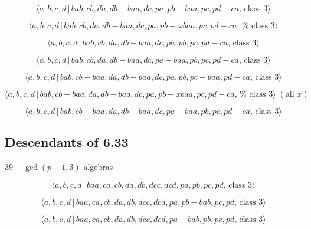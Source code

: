 \documentclass[10pt]{article}
\begin{document}
\begin{equation}
\langle a,b,c,d\,|\,bab,cb,da,db-baa,dc,pa,pb-baa,pc,pd-ca,\,\text{class }%
3\rangle  \tag{7.4075}
\end{equation}

\begin{equation}
\langle a,b,c,d\,|\,bab,cb,da,db-baa,dc,pa,pb-\omega baa,pc,pd-ca,\,\text{%
class }3\rangle  \tag{7.4076}
\end{equation}

\begin{equation}
\langle a,b,c,d\,|\,bab,cb,da,db-baa,dc,pa,pb,pc,pd-ca,\,\text{class }%
3\rangle  \tag{7.4077}
\end{equation}

\begin{equation}
\langle a,b,c,d\,|\,bab,cb,da,db-baa,dc,pa-baa,pb,pc,pd-ca,\,\text{class }%
3\rangle  \tag{7.4078}
\end{equation}

\begin{equation}
\langle a,b,c,d\,|\,bab,cb-baa,da,db-baa,dc,pa,pb,pc-baa,pd-ca,\,\text{class 
}3\rangle  \tag{7.4079}
\end{equation}

\begin{equation}
\langle a,b,c,d\,|\,bab,cb-baa,da,db-baa,dc,pa,pb-xbaa,pc,pd-ca,\,\text{%
class }3\rangle \;(\text{all }x)  \tag{7.4080}
\end{equation}

\begin{equation}
\langle a,b,c,d\,|\,bab,cb-baa,da,db-baa,dc,pa-baa,pb,pc,pd-ca,\,\text{class 
}3\rangle  \tag{7.4081}
\end{equation}

\subsection{Descendants of 6.33}

$39+\gcd (p-1,3)$ algebras

\begin{equation}
\langle a,b,c,d\,|\,baa,ca,cb,da,db,dcc,dcd,pa,pb,pc,pd,\,\text{class }%
3\rangle  \tag{7.4082}
\end{equation}

\begin{equation}
\langle a,b,c,d\,|\,baa,ca,cb,da,db,dcc,dcd,pa,pb-bab,pc,pd,\,\text{class }%
3\rangle  \tag{7.4083}
\end{equation}

\begin{equation}
\langle a,b,c,d\,|\,baa,ca,cb,da,db,dcc,dcd,pa-bab,pb,pc,pd,\,\text{class }%
3\rangle  \tag{7.4084}
\end{equation}
\end{document}

